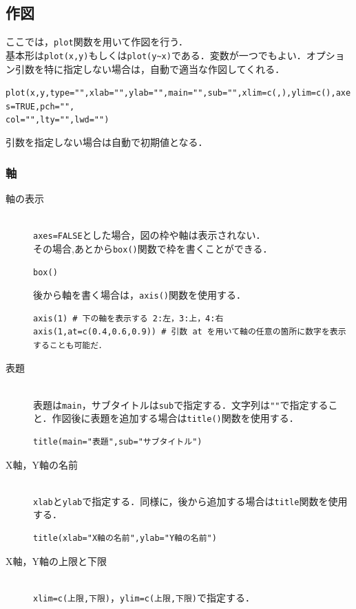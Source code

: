 \documentclass[a4paper,10pt,fleqn]{jarticle}
\begin{document}
\subsection{作図}
ここでは，{\tt plot}関数を用いて作図を行う．\\
基本形は{\tt plot(x,y)}もしくは{\tt plot(y\verb+~+x)}である．変数が一つでもよい．オプション引数を特に指定しない場合は，自動で適当な作図してくれる．
\begin{screen}
\verb+plot(x,y,type="",xlab="",ylab="",main="",sub="",xlim=c(,),ylim=c(),axes=TRUE,pch="",+\\
\verb+col="",lty="",lwd="")+ 
\end{screen}
引数を指定しない場合は自動で初期値となる．
\subsubsection{軸}
\begin{description}
\item[軸の表示] \mbox{}\\
{\tt axes=FALSE}とした場合，図の枠や軸は表示されない．\\
その場合,あとから{\tt box()}関数で枠を書くことができる．
\begin{screen}
{\tt box()}
\end{screen}
後から軸を書く場合は，{\tt axis()}関数を使用する．
\begin{screen}
\begin{verbatim}
axis(1) # 下の軸を表示する 2:左，3:上，4:右
axis(1,at=c(0.4,0.6,0.9)) # 引数 at を用いて軸の任意の箇所に数字を表示することも可能だ．
\end{verbatim}
\end{screen}
\item[表題] \mbox{}\\
表題は{\tt main}，サブタイトルは{\tt sub}で指定する．文字列は\verb+""+で指定すること．作図後に表題を追加する場合は{\tt title()}関数を使用する．
\begin{screen}
\begin{verbatim}
title(main="表題",sub="サブタイトル")
\end{verbatim}
\end{screen}
\item[X軸，Y軸の名前] \mbox{}\\
{\tt xlab}と{\tt ylab}で指定する．同様に，後から追加する場合は{\tt title}関数を使用する．
\begin{screen}
\begin{verbatim}
title(xlab="X軸の名前",ylab="Y軸の名前")
\end{verbatim}
\end{screen}
\item[X軸，Y軸の上限と下限] \mbox{}\\
{\tt xlim=c(上限,下限)}，{\tt ylim=c(上限,下限)}で指定する．
\end{description}
\end{document}
